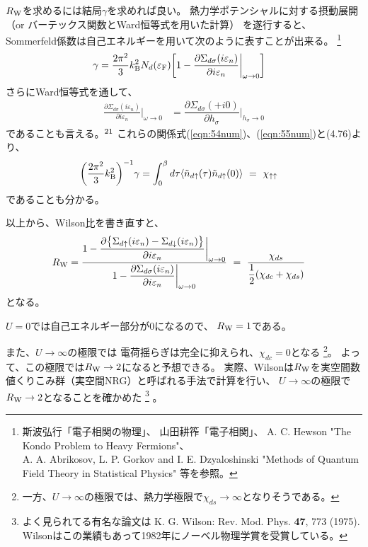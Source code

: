 \documentclass[a4j]{jarticle}
\begin{document}
$R_{\rm W}$を求めるには結局$\gamma$を求めれば良い。
熱力学ポテンシャルに対する摂動展開（or バーテックス関数とWard恒等式を用いた計算）
を遂行すると、Sommerfeld係数は自己エネルギーを用いて次のように表すことが出来る。
\footnote{
	斯波弘行「電子相関の物理」、
	山田耕筰「電子相関」、
	A. C. Hewson "The Kondo Problem to Heavy Fermions"、 \\
	A. A. Abrikosov, L. P. Gorkov and I. E. Dzyaloshinski "Methods of Quantum Field Theory in Statistical Physics"
	等を参照。
}
\begin{align}
	\gamma
	 & =
	\frac{2 \pi^{2}}{3}
	k_{\rm B}^{2}
	N_{d}(\varepsilon_{\rm F})
	\bigg[
		1
		-
		\frac{\partial \Sigma_{d \sigma} (i \varepsilon_{n}) }{\partial i \varepsilon_{n}}
		\bigg|_{\omega \to 0}
		\bigg]
	\label{eqn:54num}
\end{align}
さらにWard恒等式を通して、
\begin{align}
	\frac{\partial \Sigma_{d \sigma} (i \varepsilon_{n}) }{\partial i \varepsilon_{n}}
	\bigg|_{\omega \to 0}
	 & =
	\dfrac{\partial \Sigma_{d \sigma}(+i0)}{\partial h_{\sigma}}
	\bigg|_{h_{\sigma} \to 0}
	\label{eqn:55num}
\end{align}
であることも言える。$^{\rm 21}$
これらの関係式(\ref{eqn:54num})、(\ref{eqn:55num})と(4.76)より、
\begin{align}
	\bigg(
	\dfrac{2 \pi^{2}}{3}
	k_{\rm B}^{2}
	\bigg)^{-1}
	\gamma
	 & =
	\int^{\beta}_{0}d \tau
	\langle
	\tilde{n}_{d \uparrow}(\tau)
	\tilde{n}_{d \uparrow}(0)
	\rangle
	\ = \
	\chi_{\uparrow \uparrow}
\end{align}
であることも分かる。


以上から、Wilson比を書き直すと、
\begin{align}
	R_{\rm W}
	 & =
	\frac{
		1
		-
		\dfrac{\partial\big\{ \Sigma_{d \uparrow} (i \varepsilon_{n}) - \Sigma_{d \downarrow} (i \varepsilon_{n}) \big\} }{\partial i \varepsilon_{n} }
		\bigg|_{\omega \to 0}
	}{
		1
		-
		\dfrac{\partial \Sigma_{d \sigma} (i \varepsilon_{n}) }{\partial i \varepsilon_{n}}
		\bigg|_{\omega \to 0}
	}
	\ = \
	\frac{\chi_{ds} }{\dfrac{1}{2} ( \chi_{dc} + \chi_{ds} ) }
\end{align}
となる。

$U=0$では自己エネルギー部分が0になるので、
$R_{\rm W}=1$である。

また、$U \to \infty$の極限では
電荷揺らぎは完全に抑えられ、$\chi_{dc}=0$となる
\footnote{一方、$U \to \infty$の極限では、熱力学極限で$\chi_{ds} \to \infty$となりそうである。}。
よって、この極限では$R_{\rm W} \to 2$になると予想できる。
実際、Wilsonは$R_{\rm W}$を実空間数値くりこみ群（実空間NRG）と呼ばれる手法で計算を行い、
$U \to \infty$の極限で
$R_{\rm W} \to 2$となることを確かめた
\footnote{
	よく見られてる有名な論文は
	K. G. Wilson: Rev. Mod. Phys. {\bf 47}, 773 (1975).
	Wilsonはこの業績もあって1982年にノーベル物理学賞を受賞している。
}
。
\end{document}
